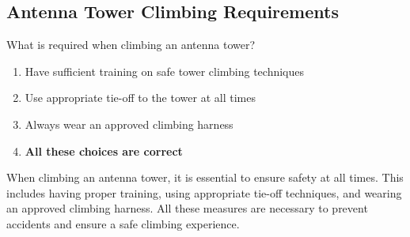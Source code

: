 \subsection{Antenna Tower Climbing Requirements}
\label{T0B02}

\begin{tcolorbox}[colback=gray!10!white,colframe=black!75!black,title=T0B02]
What is required when climbing an antenna tower?
\begin{enumerate}[noitemsep]
    \item Have sufficient training on safe tower climbing techniques
    \item Use appropriate tie-off to the tower at all times
    \item Always wear an approved climbing harness
    \item \textbf{All these choices are correct}
\end{enumerate}
\end{tcolorbox}

When climbing an antenna tower, it is essential to ensure safety at all times. This includes having proper training, using appropriate tie-off techniques, and wearing an approved climbing harness. All these measures are necessary to prevent accidents and ensure a safe climbing experience.